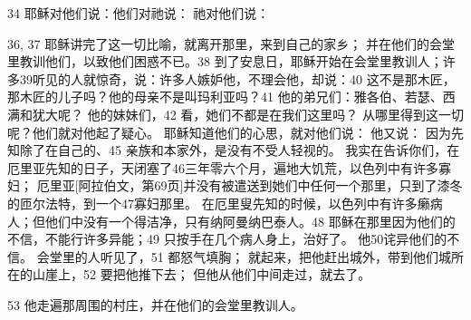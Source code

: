 34  耶稣对他们说：他们对祂说： 祂对他们说：\par

36, 37  耶稣讲完了这一切比喻，就离开那里，来到自己的家乡； 并在他们的会堂里教训他们，以致他们困惑不已。38  到了安息日，耶稣开始在会堂里教训人；许多39听见的人就惊奇，说：许多人嫉妒他，不理会他，却说：40  这不是那木匠，那木匠的儿子吗？他的母亲不是叫玛利亚吗？41 他的弟兄们：雅各伯、若瑟、西满和犹大呢？ 他的妹妹们，42 看，她们不都是在我们这里吗？ 从哪里得到这一切呢？他们就对他起了疑心。 耶稣知道他们的心思，就对他们说： 他又说： 因为先知除了在自己的、45 亲族和本家外，是没有不受人轻视的。 我实在告诉你们，在厄里亚先知的日子，天闭塞了46三年零六个月，遍地大饥荒，以色列中有许多寡妇； 厄里亚[阿拉伯文，第69页]并没有被遣送到她们中任何一个那里，只到了漆冬的匝尔法特，到一个47寡妇那里。 在厄里叟先知的时候，以色列中有许多癞病人；但他们中没有一个得洁净，只有纳阿曼纳巴泰人。48  耶稣在那里因为他们的不信，不能行许多异能；49 只按手在几个病人身上，治好了。 他50诧异他们的不信。 会堂里的人听见了，51 都怒气填胸； 就起来，把他赶出城外，带到他们城所在的山崖上，52 要把他推下去； 但他从他们中间走过，就去了。\par

53  他走遍那周围的村庄，并在他们的会堂里教训人。\par



